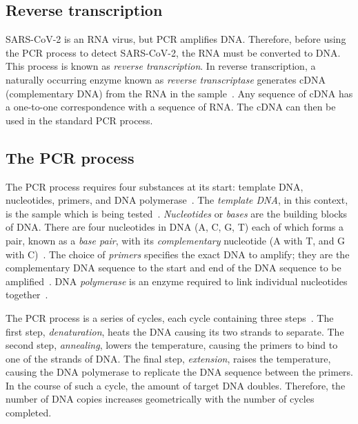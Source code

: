 \documentclass[thesis.tex]{subfiles}
\begin{document}
\subsection{Reverse transcription}

SARS-CoV-2 is an RNA virus, but PCR amplifies DNA.
Therefore, before using the PCR process to detect SARS-CoV-2, the RNA must be converted to DNA.
This process is known as \emph{reverse transcription}.
In reverse transcription, a naturally occurring enzyme known as \emph{reverse transcriptase} generates cDNA (complementary DNA) from the RNA in the sample~\autocite{valasekPower}.
Any sequence of cDNA has a one-to-one correspondence with a sequence of RNA.
The cDNA can then be used in the standard PCR process.

\subsection{The PCR process} \label{biology-data:sec:PCR-process}


The PCR process requires four substances at its start: template DNA, nucleotides, primers, and DNA polymerase~\autocite{garibyanPCR}.
The \emph{template DNA}, in this context, is the sample which is being tested~\autocite{caseTemplate}.
\emph{Nucleotides} or \emph{bases} are the building blocks of DNA.
There are four nucleotides in DNA (A, C, G, T) each of which forms a pair, known as a \emph{base pair}, with its \emph{complementary} nucleotide (A with T, and G with C)~\autocite{batesBase}.
The choice of \emph{primers} specifies the exact DNA to amplify; they are the complementary DNA sequence to the start and end of the DNA sequence to be amplified~\autocite{garibyanPCR}.
DNA \emph{polymerase} is an enzyme required to link individual nucleotides together~\autocite{garibyanPCR}.

The PCR process is a series of cycles, each cycle containing three steps~\autocite{powledgePCR,garibyanPCR}.
The first step, \emph{denaturation}, heats the DNA causing its two strands to separate.
The second step, \emph{annealing}, lowers the temperature, causing the primers to bind to one of the strands of DNA.
The final step, \emph{extension}, raises the temperature, causing the DNA polymerase to replicate the DNA sequence between the primers. 
In the course of such a cycle, the amount of target DNA doubles.
Therefore, the number of DNA copies increases geometrically with the number of cycles completed.
\end{document}
